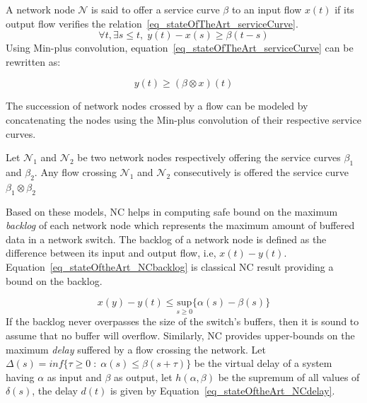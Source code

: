 \documentclass[main.tex]{subfiles}
\begin{document}
\begin{definition}
A network node $\mathcal{N}$ is said to offer a service curve $\beta$ to an input flow $x(t)$ if its output flow verifies the relation~\ref{eq_stateOfTheArt_serviceCurve}.
\begin{equation}
    \label{eq_stateOfTheArt_serviceCurve}
    \forall t, \exists s \leq t, \; y(t) - x(s) \geq \beta(t-s)
\end{equation}
Using Min-plus convolution, equation~\ref{eq_stateOfTheArt_serviceCurve} can be rewritten as:

    \begin{displaymath}
        y(t) \geq ( \beta \otimes x ) (t)
    \end{displaymath}

\end{definition}
The succession of network nodes crossed by a flow can be modeled by concatenating the nodes using the Min-plus convolution of their respective service curves.
\begin{example}
Let $\mathcal{N}_1$ and $\mathcal{N}_2$ be two network nodes respectively offering the service curves $\beta_1$ and $\beta_2$. Any flow crossing $\mathcal{N}_1$ and $\mathcal{N}_2$ consecutively is offered the service curve $\beta_1 \otimes \beta_2$
\end{example}
Based on these models, NC helps in computing safe bound on the maximum \emph{backlog} of each network node which represents the maximum amount of buffered data in a network switch. The backlog of a network node is defined as the difference between its input and output flow, i.e, $x(t) - y(t)$. Equation~\ref{eq_stateOftheArt_NCbacklog} is classical NC result providing a bound on the backlog.

\begin{equation}
    \label{eq_stateOftheArt_NCbacklog}
    x(y) - y(t) \leq \underset{s \geq 0}{\text{sup}} \{ \alpha (s) - \beta (s) \}
\end{equation}
If the backlog never overpasses the size of the switch's buffers, then it is sound to assume that no buffer will overflow. Similarly, NC provides upper-bounds on the maximum \emph{delay} suffered by a flow crossing the network. Let $\Delta (s) = inf \{ \tau \geq 0 \; : \; \alpha (s) \leq \beta ( s + \tau )\}$ be the virtual delay of a system having $\alpha$ as input and $\beta$ as output, let $h( \alpha , \beta )$ be the supremum of all values of $\delta (s)$, the delay $d(t)$ is given by Equation~\ref{eq_stateOftheArt_NCdelay}.
\end{document}
